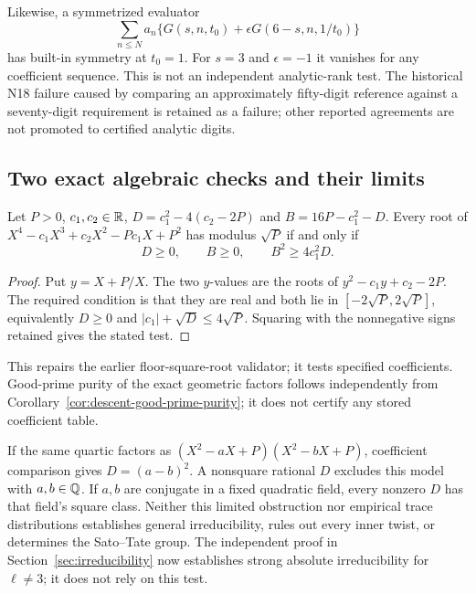 Likewise, a symmetrized evaluator
\[
 \sum_{n\le N}a_n\{G(s,n,t_0)+\epsilon G(6-s,n,1/t_0)\}
\]
has built-in symmetry at $t_0=1$. For $s=3$ and $\epsilon=-1$ it
vanishes for any coefficient sequence. This is not an independent
analytic-rank test. The historical N18 failure caused by comparing an
approximately fifty-digit reference against a seventy-digit requirement
is retained as a failure; other reported agreements are not promoted to
certified analytic digits.

\subsection{Two exact algebraic checks and their limits}
\begin{lemma}\label{lem:weil}
Let $P>0$, $c_1,c_2\in\mathbb R$,
$D=c_1^2-4(c_2-2P)$ and $B=16P-c_1^2-D$.
Every root of $X^4-c_1X^3+c_2X^2-Pc_1X+P^2$ has modulus
$\sqrt P$ if and only if
\[
 D\ge0,\qquad B\ge0,\qquad B^2\ge4c_1^2D.
\]
\end{lemma}
\begin{proof}
Put $y=X+P/X$. The two $y$-values are the roots of
$y^2-c_1y+c_2-2P$. The required condition is that they are real
and both lie in $[-2\sqrt P,2\sqrt P]$, equivalently
$D\ge0$ and $|c_1|+\sqrt D\le4\sqrt P$.
Squaring with the nonnegative signs retained gives the stated test.
\end{proof}
This repairs the earlier floor-square-root validator; it tests specified
coefficients. Good-prime purity of the exact geometric factors follows
independently from Corollary~\ref{cor:descent-good-prime-purity};
it does not certify any stored coefficient table.

If the same quartic factors as
$(X^2-aX+P)(X^2-bX+P)$, coefficient comparison gives
$D=(a-b)^2$. A nonsquare rational $D$ excludes this model with
$a,b\in\mathbb Q$. If $a,b$ are conjugate in a fixed quadratic field,
every nonzero $D$ has that field's square class. Neither this limited
obstruction nor empirical trace distributions establishes general
irreducibility, rules out every inner twist, or determines the Sato--Tate group.
The independent proof in Section~\ref{sec:irreducibility} now establishes
strong absolute irreducibility for $\ell\ne3$; it does not rely on this test.

